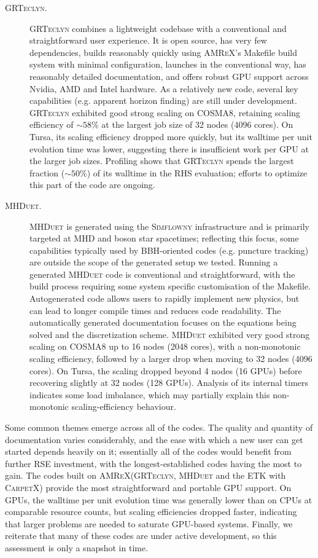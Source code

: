 \documentclass[12pt,a4paper]{article}
\numberwithin{figure}{subsection}
\newcommand{\etk}{\textsc{ETK}\xspace} %
\newcommand{\grteclyn}{\textsc{GRTeclyn}\xspace}
\newcommand{\mhduet}{\textsc{MHDuet}\xspace}
\newcommand{\amrex}{\textsc{AMReX}\xspace}
\newcommand{\carpetx}{\textsc{CarpetX}\xspace}
\newcommand{\simflowny}{\textsc{Simflowny}\xspace}
\begin{document}
\begin{description}
    \item[\grteclyn.] \grteclyn combines a lightweight codebase with
    a conventional and straightforward user experience. It is open source,
    has very few dependencies, builds reasonably quickly using \amrex's
    Makefile build system with minimal configuration, launches in the
    conventional way, has reasonably detailed documentation, and
    offers robust GPU support across Nvidia, AMD and Intel hardware. As a
    relatively new code, several key capabilities (e.g. apparent horizon
    finding) are still under development. \grteclyn exhibited good strong scaling on COSMA8,
    retaining scaling efficiency of $\sim 58\%$ at the largest job size of 32 nodes (4096 cores). On Tursa, its
    scaling efficiency dropped more quickly, but its walltime
    per unit evolution time was lower, suggesting there is
    insufficient work per GPU at the larger job sizes. Profiling shows that
    \grteclyn spends the largest fraction ($\sim 50\%$) of its walltime in the
    RHS evaluation; 
    efforts to optimize this part of the code are ongoing.

    \item[\mhduet.] \mhduet is generated using the \simflowny infrastructure
    and is primarily targeted at MHD and boson star spacetimes; reflecting
    this focus, some capabilities typically used by BBH-oriented codes (e.g.
    puncture tracking) are outside the scope of the generated setup we
    tested. Running a generated \mhduet code is conventional and straightforward, with the build process requiring some system specific customisation of the Makefile. Autogenerated
    code allows users to rapidly implement new physics, but can lead to longer compile times and 
    reduces code readability. The automatically generated documentation focuses on the equations
    being solved and the discretization scheme. \mhduet exhibited very good
    strong scaling on COSMA8 up to 16 nodes (2048 cores), with a
    non-monotonic scaling efficiency, followed by a larger drop when moving
    to 32 nodes (4096 cores). On Tursa, the scaling dropped
    beyond 4 nodes (16 GPUs) before recovering slightly at 32 nodes (128
    GPUs). Analysis of its internal timers indicates some load imbalance, 
    which may partially explain this
    non-monotonic scaling-efficiency behaviour.
\end{description}

Some common themes emerge across all of the codes. The quality and quantity
of documentation varies considerably, and the ease with which a new user can
get started depends heavily on it; essentially all of the codes would benefit
from further RSE investment, with the longest-established codes having the
most to gain. The codes built on \amrex (\grteclyn, \mhduet and the \etk with
\carpetx) provide the most straightforward and portable GPU support. On GPUs,
the walltime per unit evolution time was generally lower than on CPUs at
comparable resource counts, but scaling efficiencies dropped faster, indicating
that larger problems are needed to saturate GPU-based systems.  Finally, we
reiterate that many of these codes are under active development, so this
assessment is only a snapshot in time.
\end{document}
